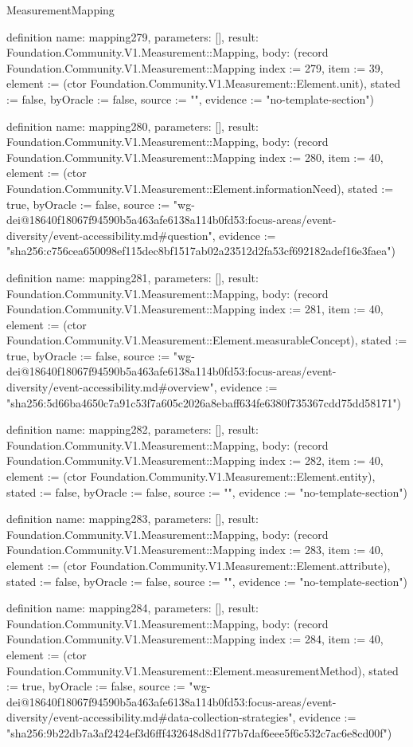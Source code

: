 \begin{lexlean}{MeasurementMapping}
\begin{semanticmodule}
definition{
  name: mapping279,
  parameters: [],
  result: Foundation.Community.V1.Measurement::Mapping,
  body: (record Foundation.Community.V1.Measurement::Mapping {index := 279, item := 39, element := (ctor Foundation.Community.V1.Measurement::Element.unit), stated := false, byOracle := false, source := "", evidence := "no-template-section"})
}

definition{
  name: mapping280,
  parameters: [],
  result: Foundation.Community.V1.Measurement::Mapping,
  body: (record Foundation.Community.V1.Measurement::Mapping {index := 280, item := 40, element := (ctor Foundation.Community.V1.Measurement::Element.informationNeed), stated := true, byOracle := false, source := "wg-dei@18640f18067f94590b5a463afe6138a114b0fd53:focus-areas/event-diversity/event-accessibility.md#question", evidence := "sha256:c756cea650098ef115dec8bf1517ab02a23512d2fa53cf692182adef16e3faea"})
}

definition{
  name: mapping281,
  parameters: [],
  result: Foundation.Community.V1.Measurement::Mapping,
  body: (record Foundation.Community.V1.Measurement::Mapping {index := 281, item := 40, element := (ctor Foundation.Community.V1.Measurement::Element.measurableConcept), stated := true, byOracle := false, source := "wg-dei@18640f18067f94590b5a463afe6138a114b0fd53:focus-areas/event-diversity/event-accessibility.md#overview", evidence := "sha256:5d66ba4650c7a91c53f7a605c2026a8ebaff634fe6380f735367cdd75dd58171"})
}

definition{
  name: mapping282,
  parameters: [],
  result: Foundation.Community.V1.Measurement::Mapping,
  body: (record Foundation.Community.V1.Measurement::Mapping {index := 282, item := 40, element := (ctor Foundation.Community.V1.Measurement::Element.entity), stated := false, byOracle := false, source := "", evidence := "no-template-section"})
}

definition{
  name: mapping283,
  parameters: [],
  result: Foundation.Community.V1.Measurement::Mapping,
  body: (record Foundation.Community.V1.Measurement::Mapping {index := 283, item := 40, element := (ctor Foundation.Community.V1.Measurement::Element.attribute), stated := false, byOracle := false, source := "", evidence := "no-template-section"})
}

definition{
  name: mapping284,
  parameters: [],
  result: Foundation.Community.V1.Measurement::Mapping,
  body: (record Foundation.Community.V1.Measurement::Mapping {index := 284, item := 40, element := (ctor Foundation.Community.V1.Measurement::Element.measurementMethod), stated := true, byOracle := false, source := "wg-dei@18640f18067f94590b5a463afe6138a114b0fd53:focus-areas/event-diversity/event-accessibility.md#data-collection-strategies", evidence := "sha256:9b22db7a3af2424ef3d6fff432648d8d1f77b7daf6eee5f6c532c7ac6e8cd00f"})
}


\end{semanticmodule}
\end{lexlean}
